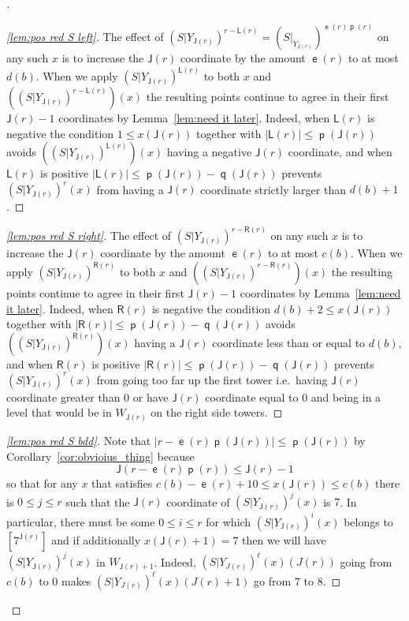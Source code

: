 \documentclass[10pt]{amsart}
\theoremstyle{definition}\newtheorem{defi}[theo]{Definition}\newtheorem{rema}[theo]{Remark}\newtheorem{exam}[theo]{Example}\newtheorem{exem}[theo]{Example}\newtheorem{nota}[theo]{Notation}
\DeclareMathOperator{\lst}{\mathsf{e}}
\DeclareMathOperator{\p}{\mathsf{p}}
\DeclareMathOperator{\q}{\mathsf{q}}
\newcommand{\lft}{\mathsf{L}}
\newcommand{\rht}{\mathsf{R}}
\newcommand{\scl}{\mathsf{J}}
\newenvironment{proofc}[1][\proofname]{\begin{proof}[#1]}{\end{proof}}
\begin{document}
\begin{proofc}
\begin{proof}[{\eqref{lem:pos red S left}}]
The effect of $(S|Y_{\scl(r)})^{r -
\lft(r)}=(S|_{Y_{\scl(r)}})^{\lst(r)\p(r)}$ on any such $x$ is to increase the $\scl(r)$ coordinate by the amount $\lst(r)$ to at most $d(b)$. When we apply $(S|Y_{\scl(r)})^{\lft(r)}$ to both $x$ and $((S|Y_{\scl(r)})^{r -
\lft(r)})(x)$ the resulting points continue to agree in their first $\scl(r) - 1$ coordinates by Lemma~\ref{lem:need it later}. Indeed, when $\lft(r)$ is negative the condition $1 \le x(\scl(r))$ together with $|\lft(r)| \le
\p(\scl(r))$ avoids $((S|Y_{\scl(r)})^{\lft(r)})(x)$ having a negative $\scl(r)$ coordinate, and when $\lft(r)$ is positive $|\lft(r)| \le
\p(\scl(r)) - \q(\scl(r))$ prevents $(S|Y_{\scl(r)})^r(x)$ from having a $\scl(r)$ coordinate strictly larger than $ d(b) + 1$.\let\qed\relax
\end{proof}

\begin{proof}[{\eqref{lem:pos red S right}}]
The effect of $(S|Y_{\scl(r)})^{r - \rht(r)}$ on any such $x$ is to increase the $\scl(r)$ coordinate by the amount $\lst(r)$ to at most $c(b)$. When we apply $(S|Y_{\scl(r)})^{\rht(r)}$ to both $x$ and $((S|Y_{\scl(r)})^{r - \rht(r)})(x)$ the resulting points continue to agree in their first $\scl(r) - 1$ coordinates by Lemma~\ref{lem:need it later}. Indeed, when $\rht(r)$ is negative the condition $d(b) + 2 \le x(\scl(r))$ together with $|\rht(r)| \le \p(\scl(r)) - \q(\scl(r))$ avoids $((S|Y_{\scl(r)})^{\rht(r)})(x)$ having a $\scl(r)$ coordinate less than or equal to $d(b)$, and when $\rht(r)$ is positive $|\rht(r)| \le \p(\scl(r)) - \q(\scl(r))$ prevents $(S|Y_{\scl(r)})^r(x)$ from going too far up the first tower i.e.\ having $\scl(r)$ coordinate greater than 0 or have $\scl(r)$ coordinate equal to 0 and being in a level that would be in $W_{\scl(r)}$ on the right side towers.
\let\qed\relax
\end{proof}

\begin{proof}[{\eqref{lem:pos red S bdd}}]
Note that $|r - \lst(r) \p(\scl(r))| \le
\p(\scl(r))$ by Corollary~\ref{cor:obvioius_thing} because
\[
\scl(r - \lst(r) \p(r)) \le \scl(r) - 1
\]
so that for any $x$ that satisfies $c(b) - \lst(r) + 10 \le x(\scl(r)) \le c(b)$ there is $0 \le j \le r$ such that the $\scl(r)$ coordinate of $(S|Y_{\scl(r)})^j(x)$ is $7$. In particular, there must be some $0 \le i \le r$ for which $(S|Y_{\scl(r)})^i(x)$ belongs to $[7^{\scl(r)}]$ and if additionally $x(\scl(r) + 1) = 7$ then we will have $(S|Y_{\scl(r)})^j(x)$ in $W_{\scl(r)+1}$. Indeed, $(S|Y_{J(r)})^\ell (x)(J(r))$ going from $c(b)$ to 0 makes $(S|Y_{J(r)})^\ell (x)(J(r)+1)$ go from $7$ to $8$.
\end{proof}\let\qed\relax
\end{proofc}
\end{document}
